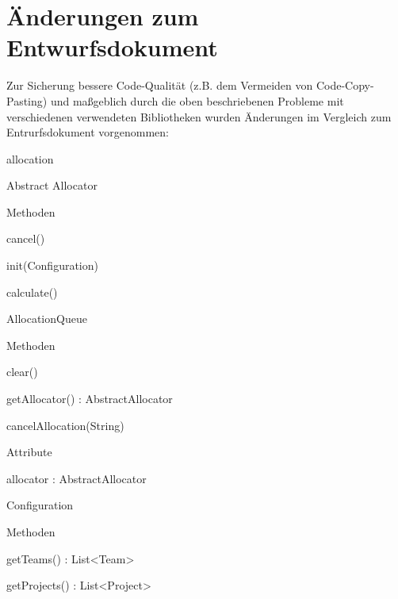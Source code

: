 \documentclass[parskip=full]{scrartcl}
\begin{document}
\section{Änderungen zum Entwurfsdokument}
Zur Sicherung bessere Code-Qualität (z.B. dem Vermeiden von Code-Copy-Pasting)
und maßgeblich durch die oben beschriebenen Probleme mit verschiedenen
verwendeten Bibliotheken  wurden Änderungen im Vergleich zum  Entrurfsdokument
vorgenommen:
\begin{itemPackage}
\item allocation
\begin{itemClass}
\item Abstract Allocator
\begin{itemClassSub}
\item Methoden
\begin{itemPlus}
\item cancel() 
\item init(Configuration)
\end{itemPlus}
\begin{itemChange}
\item calculate()
\end{itemChange}
\end{itemClassSub}
\item AllocationQueue
\begin{itemClassSub}
\item Methoden
\begin{itemPlus}
\item clear()
\item getAllocator() : AbstractAllocator
\end{itemPlus}
\begin{itemChange}
\item cancelAllocation(String)
\end{itemChange}
\item Attribute
\begin{itemPlus}
\item allocator : AbstractAllocator
\end{itemPlus}
\end{itemClassSub}
\item Configuration
\begin{itemClassSub}
\item Methoden
\begin{itemPlus}
\item getTeams() : List<Team>
\end{itemPlus}
\begin{itemMinus}
\item getProjects() : List<Project>

\end{itemMinus}
\end{itemClassSub}
\end{itemClass}
\end{itemPackage}
\end{document}
